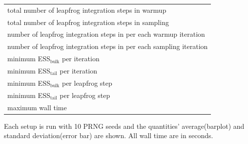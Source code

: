 \documentclass[landscape,a0paper,fontscale=0.5]{baposter} %
\newenvironment{ColFigure}
  {\par\medskip\noindent\minipage{\linewidth}}
  {\endminipage\par\medskip}
\begin{document}
\begin{poster}
{\begin{multicols}{2}
\begin{center}
\begin{tabular}{l}
\hline
total number of leapfrog integration steps in warmup \\
total number of leapfrog integration steps in sampling \\
number of leapfrog integration steps in per each warmup iteration \\
number of leapfrog integration steps in per each sampling iteration \\
minimum ESS\(_{\text{bulk}}\) per iteration \\
minimum ESS\(_{\text{tail}}\) per iteration \\
minimum ESS\(_{\text{bulk}}\) per leapfrog step \\
minimum ESS\(_{\text{tail}}\) per leapfrog step \\
maximum wall time
\hline
\end{tabular}
\end{center}
Each setup is run with 10 PRNG seeds and the quantities' average(barplot)
and standard deviation(error bar) are shown. All wall time are in seconds.




\end{multicols}


}
\end{poster}
\end{document}
